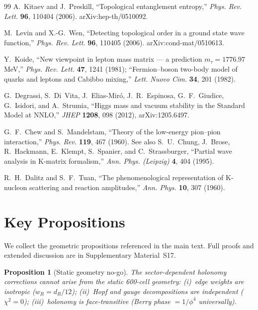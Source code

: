 \documentclass[12pt,a4paper]{article}
\newtheorem{proposition}{Proposition}
\theoremstyle{definition}
\begin{document}
\begin{thebibliography}{99}
A.~Kitaev and J.~Preskill, ``Topological entanglement entropy,'' \textit{Phys. Rev. Lett.} \textbf{96}, 110404 (2006). arXiv:hep-th/0510092.

M.~Levin and X.-G.~Wen, ``Detecting topological order in a ground state wave function,'' \textit{Phys. Rev. Lett.} \textbf{96}, 110405 (2006). arXiv:cond-mat/0510613.

Y.~Koide, ``New viewpoint in lepton mass matrix --- a prediction $m_\tau = 1776.97$ MeV,'' \textit{Phys. Rev. Lett.} \textbf{47}, 1241 (1981); ``Fermion--boson two-body model of quarks and leptons and Cabibbo mixing,'' \textit{Lett. Nuovo Cim.} \textbf{34}, 201 (1982).

G.~Degrassi, S.~Di~Vita, J.~Elias-Mir{\'o}, J.~R.~Espinosa, G.~F.~Giudice, G.~Isidori, and A.~Strumia, ``Higgs mass and vacuum stability in the Standard Model at NNLO,'' \textit{JHEP} \textbf{1208}, 098 (2012), arXiv:1205.6497.

G.~F.~Chew and S.~Mandelstam, ``Theory of the low-energy pion--pion interaction,'' \textit{Phys. Rev.} \textbf{119}, 467 (1960).
See also S.~U.~Chung, J.~Brose, R.~Hackmann, E.~Klempt, S.~Spanier, and C.~Strassburger, ``Partial wave analysis in K-matrix formalism,'' \textit{Ann. Phys. (Leipzig)} \textbf{4}, 404 (1995).

R.~H.~Dalitz and S.~F.~Tuan, ``The phenomenological representation of K-nucleon scattering and reaction amplitudes,'' \textit{Ann. Phys.} \textbf{10}, 307 (1960).

\end{thebibliography}


\appendix
\section{Key Propositions}
\label{app:propositions}

We collect the geometric propositions referenced in the main text.  Full proofs and extended discussion are in Supplementary Material~S17.

\begin{proposition}[Static geometry no-go]\label{prop:nogo}
The sector-dependent holonomy corrections cannot arise from the static 600-cell geometry: (i)~edge weights are isotropic ($w_R = d_R/12$); (ii)~Hopf and gauge decompositions are independent ($\chi^2 = 0$); (iii)~holonomy is face-transitive (Berry phase $= 1/\phi^4$ universally).
\end{proposition}
\end{document}
